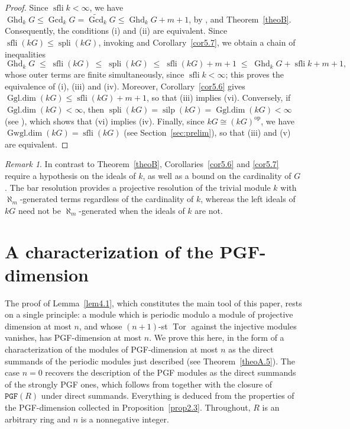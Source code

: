 \documentclass[12pt]{amsart}
\theoremstyle{remark}
\newtheorem{remark}[theorem]{Remark}
\theoremstyle{definition}
\theoremstyle{plain}
\DeclareMathOperator{\Ghd}{Ghd}
\DeclareMathOperator{\Gcd}{Gcd}
\DeclareMathOperator{\sfli}{sfli}
\DeclareMathOperator{\spli}{spli}
\DeclareMathOperator{\silp}{silp}
\DeclareMathOperator{\Gwgl}{Gwgl.dim}
\DeclareMathOperator{\Ggl}{Ggl.dim}
\DeclareMathOperator{\Tor}{Tor}
\newcommand{\PGFcd}{\widetilde{\Gcd}}
\newcommand{\PGF}{\mathtt{PGF}}
\newcommand{\alephm}{\aleph_m}
\begin{document}
\begin{proof} Since $\sfli k<\infty$, we have $\Ghd_kG\le\Gcd_kG=\PGFcd_kG\le\Ghd_kG+m+1$, by \cite[Theorem~3.10]{KS}, \cite[Proposition 2.13]{St0} and Theorem~\ref{theoB}. Consequently, the conditions (i) and (ii) are equivalent. Since $\sfli(kG)\le\spli(kG)$, invoking \cite[Corollary~6.2]{KS} and Corollary~\ref{cor5.7}, we obtain a chain of inequalities
\[
\Ghd_kG\;\le\;\sfli(kG)\;\le\;\spli(kG)\;\le\;\sfli(kG)+m+1\;\le\;\Ghd_kG+\sfli k+m+1 ,
\]
whose outer terms are finite simultaneously, since $\sfli k<\infty$; this proves the equivalence of (i), (iii) and (iv). Moreover, Corollary~\ref{cor5.6} gives $\Ggl(kG)\le\sfli(kG)+m+1$, so that (iii) implies (vi). Conversely, if $\Ggl(kG)<\infty$, then $\spli(kG)=\silp(kG)=\Ggl(kG)<\infty$ (see \cite[Theorem~4.1]{Emm}), which shows that (vi) implies (iv). Finally, since $kG\cong(kG)^{\mathrm{op}}$, we have $\Gwgl(kG)=\sfli(kG)$ (see Section~\ref{sec:prelim}), so that (iii) and (v) are equivalent. \end{proof}

\begin{remark}\label{rem5.9}
In contrast to Theorem~\ref{theoB}, Corollaries~\ref{cor5.6} and \ref{cor5.7} require a hypothesis on the ideals of $k$, as well as a bound on the cardinality of $G$. The bar resolution provides a projective resolution of the trivial module $k$ with $\alephm$-generated terms regardless of the cardinality of $k$, whereas the left ideals of $kG$ need not be $\alephm$-generated when the ideals of $k$ are not.\end{remark}


\appendix

\section{A characterization of the PGF-dimension}\label{sec:appendix}

The proof of Lemma~\ref{lem4.1}, which constitutes the main tool of this paper, rests on a single principle: a module which is periodic modulo a module of projective dimension at most $n$, and whose $(n+1)$-st $\Tor$ against the injective modules vanishes, has PGF-dimension at most $n$. We prove this here, in the form of a characterization of the modules of PGF-dimension at most $n$ as the direct summands of the periodic modules just described (see Theorem~\ref{theoA.5}). The case $n=0$ recovers the description of the PGF modules as the direct summands of the strongly PGF ones, which follows from \cite[Lemma~4.1]{SS} together with the closure of $\PGF(R)$ under direct summands. Everything is deduced from the properties of the PGF-dimension collected in Proposition~\ref{prop2.3}. Throughout, $R$ is an arbitrary ring and $n$ is a nonnegative integer.
\end{document}
